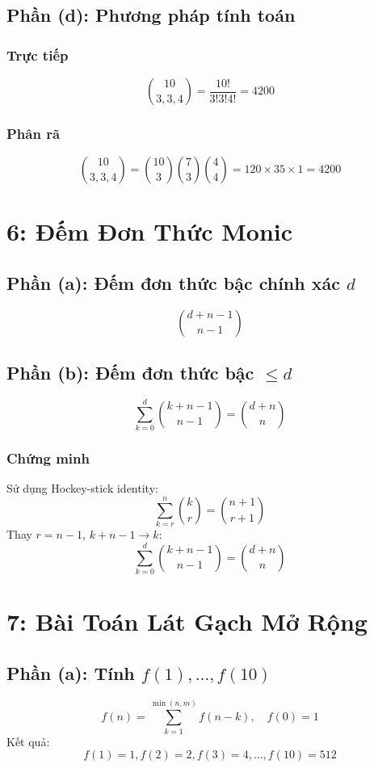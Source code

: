 \documentclass[a4paper,12pt]{article}
\theoremstyle{plain}
\theoremstyle{definition}
\begin{document}
\subsection*{Phần (d): Phương pháp tính toán}

\subsubsection*{Trực tiếp}
\[
\binom{10}{3,3,4} = \frac{10!}{3!3!4!} = 4200
\]

\subsubsection*{Phân rã}
\[
\binom{10}{3,3,4} = \binom{10}{3}\binom{7}{3}\binom{4}{4} = 120 \times 35 \times 1 = 4200
\]


\section*{6: Đếm Đơn Thức Monic}

\subsection*{Phần (a): Đếm đơn thức bậc chính xác \( d \)}
\[
\binom{d+n-1}{n-1}
\]

\subsection*{Phần (b): Đếm đơn thức bậc \( \leq d \)}
\[
\sum_{k=0}^d \binom{k+n-1}{n-1} = \binom{d+n}{n}
\]

\subsubsection*{Chứng minh}
Sử dụng Hockey-stick identity:
\[
\sum_{k=r}^n \binom{k}{r} = \binom{n+1}{r+1}
\]
Thay \( r = n-1 \), \( k+n-1 \to k \):
\[
\sum_{k=0}^d \binom{k+n-1}{n-1} = \binom{d+n}{n}
\]

\section*{7: Bài Toán Lát Gạch Mở Rộng}

\subsection*{Phần (a): Tính \( f(1), \ldots, f(10) \)}
\[
f(n) = \sum_{k=1}^{\min(n,m)} f(n-k), \quad f(0) = 1
\]
Kết quả:
\[
f(1)=1, f(2)=2, f(3)=4, \ldots, f(10)=512
\]
\end{document}
